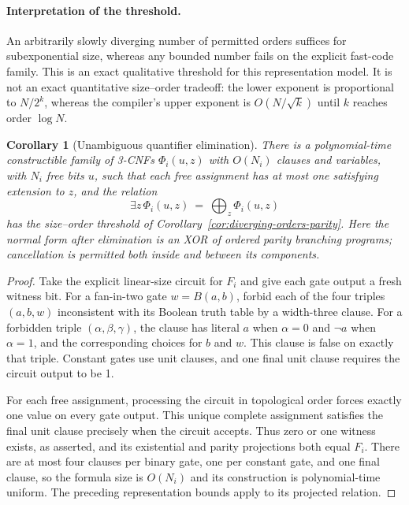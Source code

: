 \documentclass[11pt]{article}
\newtheorem{corollary}[theorem]{Corollary}
\theoremstyle{definition}
\theoremstyle{remark}
\begin{document}
\paragraph{Interpretation of the threshold.}
An arbitrarily slowly diverging number of permitted orders suffices
for subexponential size, whereas any bounded number fails on the
explicit fast-code family.  This is an exact qualitative threshold
for this representation model.  It is not an exact quantitative
size--order tradeoff: the lower exponent is proportional to $N/2^k$,
whereas the compiler's upper exponent is $O(N/\sqrt{k})$ until
$k$ reaches order $\log N$.

\begin{corollary}[Unambiguous quantifier elimination]
\label{cor:unambiguous-qe}
There is a polynomial-time constructible family of 3-CNFs
$\Phi_i(u,z)$ with $O(N_i)$ clauses and variables, with $N_i$ free
bits $u$, such that each free assignment has at most one satisfying
extension to $z$, and the relation
\[
                \exists z\,\Phi_i(u,z)
                \ =\ \bigoplus_z\Phi_i(u,z)
\]
has the size--order threshold of
Corollary~\ref{cor:diverging-orders-parity}.
Here the normal form after elimination is an XOR of ordered parity
branching programs; cancellation is permitted both inside and between
its components.
\end{corollary}
\begin{proof}
Take the explicit linear-size circuit for $F_i$ and give each gate
output a fresh witness bit.
For a fan-in-two gate $w=B(a,b)$, forbid each of the four triples
$(a,b,w)$ inconsistent with its Boolean truth table by a width-three
clause.  For a forbidden triple $(\alpha,\beta,\gamma)$, the clause
has literal $a$ when $\alpha=0$ and $\neg a$ when $\alpha=1$, and
the corresponding choices for $b$ and $w$.
This clause is false on exactly that triple.
Constant gates use unit clauses, and one final unit clause requires
the circuit output to be 1.

For each free assignment, processing the circuit in topological order
forces exactly one value on every gate output.  This unique complete
assignment satisfies the final unit clause precisely when the circuit
accepts.  Thus zero or one witness exists, as asserted, and its
existential and parity projections both equal $F_i$.
There are at most four clauses per binary gate, one per constant gate,
and one final clause, so the formula size is $O(N_i)$ and its
construction is polynomial-time uniform.
The preceding representation bounds apply to its projected relation.
\end{proof}
\end{document}

